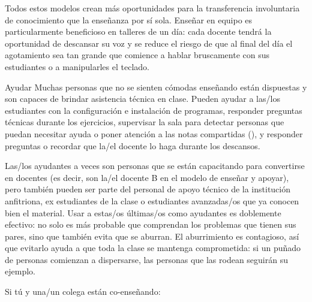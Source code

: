 Todos estos modelos crean más oportunidades para la transferencia involuntaria de conocimiento que la enseñanza por sí sola.
Enseñar en equipo es particularmente beneficioso en talleres de un día:
cada docente tendrá la oportunidad de descansar su voz
y se reduce el riesgo de que al final del día el agotamiento sea tan grande
que comience a hablar bruscamente con sus estudiantes
o a manipularles el teclado.

\begin{aside}{Ayudar}
  Muchas personas que no se sienten cómodas enseñando
  están dispuestas y son capaces de brindar asistencia técnica en clase.
  Pueden ayudar a las/los estudiantes con la configuración e instalación de programas,
  responder preguntas técnicas durante los ejercicios,
  supervisar la sala para detectar personas que puedan necesitar ayuda
  o poner atención a las notas compartidas (),
  y responder preguntas
  o recordar que la/el docente lo haga durante los descansos.

  Las/los ayudantes a veces son personas que se están capacitando para convertirse en docentes
  (es decir, son la/el docente B en el modelo de enseñar y apoyar),
  pero también pueden ser parte del personal de apoyo técnico de la institución anfitriona,
  ex estudiantes de la clase
  o estudiantes avanzadas/os que ya conocen bien el material.
  Usar a estas/os últimas/os como ayudantes es doblemente efectivo: no solo es más probable que comprendan los problemas que tienen sus pares,
  sino que también evita que se aburran.
  El aburrimiento es contagioso, así que evitarlo ayuda a que toda la clase se mantenga comprometida:
  si un puñado de personas comienzan a dispersarse,
  las personas que las rodean seguirán su ejemplo.
\end{aside}

Si tú y una/un colega están co-enseñando:

